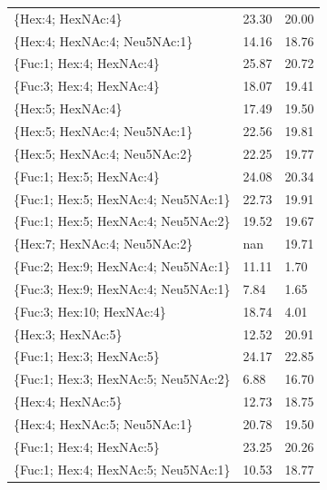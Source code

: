 \begin{table}
\begin{minipage}[t]{0.55\linewidth}
\begin{small}
\begin{tabular}{l|p{2cm} p{2cm}}
\{Hex:4; HexNAc:4\}                   &                23.30 &              20.00 \\
\{Hex:4; HexNAc:4; Neu5NAc:1\}        &                14.16 &              18.76 \\
\{Fuc:1; Hex:4; HexNAc:4\}            &                25.87 &              20.72 \\
\{Fuc:3; Hex:4; HexNAc:4\}            &                18.07 &              19.41 \\
\{Hex:5; HexNAc:4\}                   &                17.49 &              19.50 \\
\{Hex:5; HexNAc:4; Neu5NAc:1\}        &                22.56 &              19.81 \\
\{Hex:5; HexNAc:4; Neu5NAc:2\}        &                22.25 &              19.77 \\
\{Fuc:1; Hex:5; HexNAc:4\}            &                24.08 &              20.34 \\
\{Fuc:1; Hex:5; HexNAc:4; Neu5NAc:1\} &                22.73 &              19.91 \\
\{Fuc:1; Hex:5; HexNAc:4; Neu5NAc:2\} &                19.52 &              19.67 \\
\{Hex:7; HexNAc:4; Neu5NAc:2\}        &                  nan &              19.71 \\
\{Fuc:2; Hex:9; HexNAc:4; Neu5NAc:1\} &                11.11 &               1.70 \\
\{Fuc:3; Hex:9; HexNAc:4; Neu5NAc:1\} &                 7.84 &               1.65 \\
\{Fuc:3; Hex:10; HexNAc:4\}           &                18.74 &               4.01 \\
\{Hex:3; HexNAc:5\}                   &                12.52 &              20.91 \\
\{Fuc:1; Hex:3; HexNAc:5\}            &                24.17 &              22.85 \\
\{Fuc:1; Hex:3; HexNAc:5; Neu5NAc:2\} &                 6.88 &              16.70 \\
\{Hex:4; HexNAc:5\}                   &                12.73 &              18.75 \\
\{Hex:4; HexNAc:5; Neu5NAc:1\}        &                20.78 &              19.50 \\
\{Fuc:1; Hex:4; HexNAc:5\}            &                23.25 &              20.26 \\
\{Fuc:1; Hex:4; HexNAc:5; Neu5NAc:1\} &                10.53 &              18.77 \\

\end{tabular}
\end{small}
\end{minipage}
\end{table}
